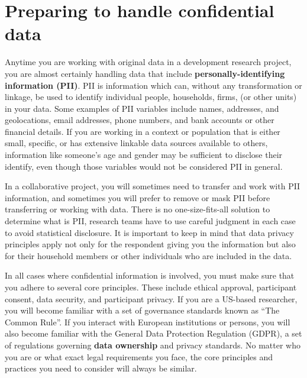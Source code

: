 
\section{Preparing to handle confidential data}

Anytime you are working with original data in a development research project,
you are almost certainly handling data that include
\textbf{personally-identifying information (PII)}.
PII is information which can, without any transformation or linkage,
be used to identify individual people, households, firms,
(or other units) in your data.
Some examples of PII variables include names, addresses, and geolocations,
email addresses, phone numbers,
and bank accounts or other financial details.
If you are working in a context or population that is either small, specific,
or has extensive linkable data sources available to others,
information like someone's age and gender may be sufficient to
disclose their identify, even though those variables would not be considered PII in general.

In a collaborative project,
you will sometimes need to transfer and work with PII information,
and sometimes you will prefer to remove or mask PII
before transferring or working with data.
There is no one-size-fits-all solution to determine what is PII,
research teams have to use careful judgment in each case to avoid statistical disclosure.
It is important to keep in mind that data privacy principles apply
not only for the respondent giving you the information
but also for their household members or other individuals who are included in the data.

In all cases where confidential information is involved,
you must make sure that you adhere to several core principles.
These include ethical approval, participant consent,
data security, and participant privacy.
If you are a US-based researcher, you will become familiar
with a set of governance standards known as ``The Common Rule''.
If you interact with European institutions or persons,
you will also become familiar with the General Data Protection Regulation (GDPR),
a set of regulations governing \textbf{data ownership} and privacy standards.
No matter who you are or what exact legal requirements you face,
the core principles and practices you need to consider will always be similar.

